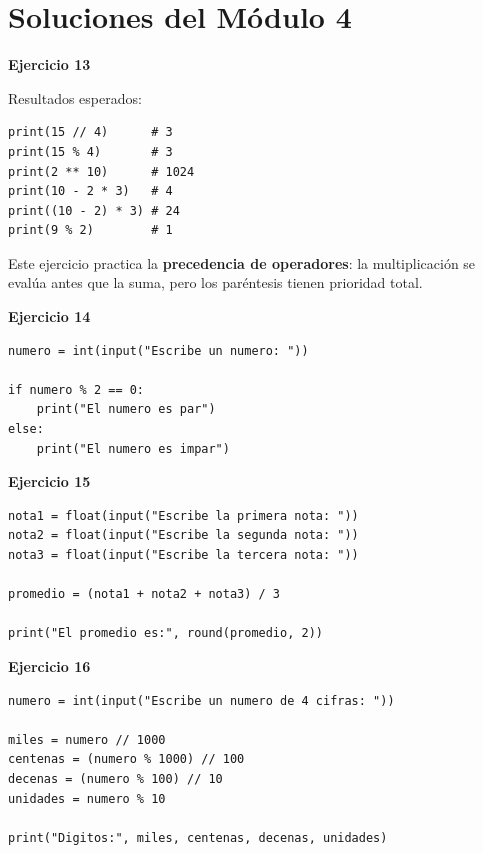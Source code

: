 \documentclass[12pt,a4paper]{article}
\begin{document}
\section{Soluciones del Módulo 4}

\begin{cajaSolucion}
\textbf{Ejercicio 13}

Resultados esperados:
\begin{lstlisting}[style=pythonStyle]
print(15 // 4)      # 3
print(15 % 4)       # 3
print(2 ** 10)      # 1024
print(10 - 2 * 3)   # 4
print((10 - 2) * 3) # 24
print(9 % 2)        # 1
\end{lstlisting}

\begin{cajaNota}
Este ejercicio practica la \textbf{precedencia de operadores}: la multiplicación se evalúa antes que la suma, pero los paréntesis tienen prioridad total.
\end{cajaNota}
\end{cajaSolucion}

\begin{cajaSolucion}
\textbf{Ejercicio 14}
\begin{lstlisting}[style=pythonStyle]
numero = int(input("Escribe un numero: "))

if numero % 2 == 0:
    print("El numero es par")
else:
    print("El numero es impar")
\end{lstlisting}
\end{cajaSolucion}

\begin{cajaSolucion}
\textbf{Ejercicio 15}
\begin{lstlisting}[style=pythonStyle]
nota1 = float(input("Escribe la primera nota: "))
nota2 = float(input("Escribe la segunda nota: "))
nota3 = float(input("Escribe la tercera nota: "))

promedio = (nota1 + nota2 + nota3) / 3

print("El promedio es:", round(promedio, 2))
\end{lstlisting}
\end{cajaSolucion}

\begin{cajaSolucion}
\textbf{Ejercicio 16}
\begin{lstlisting}[style=pythonStyle]
numero = int(input("Escribe un numero de 4 cifras: "))

miles = numero // 1000
centenas = (numero % 1000) // 100
decenas = (numero % 100) // 10
unidades = numero % 10

print("Digitos:", miles, centenas, decenas, unidades)
\end{lstlisting}
\end{cajaSolucion}
\end{document}
